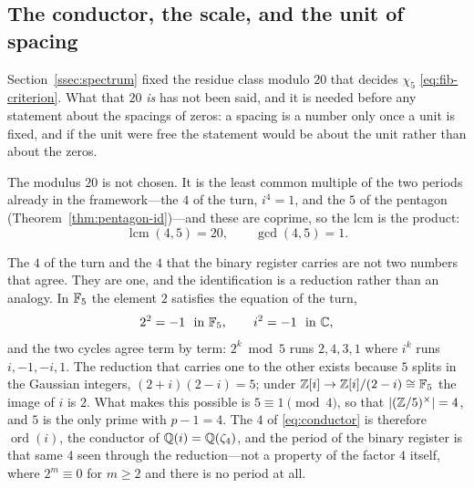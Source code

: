 \subsection{The conductor, the scale, and the unit of spacing}\label{ssec:spacings}

Section~\ref{ssec:spectrum} fixed the residue class modulo $20$ that decides $\chi_5$
\eqref{eq:fib-criterion}. What that $20$ \emph{is} has not been said, and it is needed before any
statement about the spacings of zeros: a spacing is a number only once a unit is fixed, and if the
unit were free the statement would be about the unit rather than about the zeros.

\begin{proposition}\label{prop:conductor}
The modulus $20$ is not chosen. It is the least common multiple of the two periods already in the
framework---the $4$ of the turn, $i^{4}=1$, and the $5$ of the pentagon
(Theorem~\ref{thm:pentagon-id})---and these are coprime, so the lcm is the product:
\begin{equation}\label{eq:conductor}
  \operatorname{lcm}(4,5)=20,\qquad \gcd(4,5)=1 .
\end{equation}
\end{proposition}

\begin{proposition}\label{prop:four-cocone}
The $4$ of the turn and the $4$ that the binary register carries are not two numbers that agree.
They are one, and the identification is a reduction rather than an analogy. In $\mathbb{F}_5$ the element
$2$ satisfies the equation of the turn,
\begin{equation}\label{eq:two-is-i}
  2^{2}=-1 \ \text{ in } \mathbb{F}_5, \qquad i^{2}=-1 \ \text{ in } \mathbb{C} ,
\end{equation}
and the two cycles agree term by term: $2^{k}\bmod 5$ runs $2,4,3,1$ where $i^{k}$ runs
$i,-1,-i,1$. The reduction that carries one to the other exists because $5$ splits in the Gaussian
integers, $(2+i)(2-i)=5$; under $\mathbb{Z}[i]\to\mathbb{Z}[i]/(2-i)\cong\mathbb{F}_5$ the image of $i$ is $2$. What makes
this possible is $5\equiv1\pmod4$, so that $\lvert(\mathbb{Z}/5)^{\times}\rvert=4$, and $5$ is the only
prime with $p-1=4$. The $4$ of \eqref{eq:conductor} is therefore $\operatorname{ord}(i)$, the
conductor of $\mathbb{Q}(i)=\mathbb{Q}(\zeta_4)$, and the period of the binary register is that same $4$ seen
through the reduction---not a property of the factor $4$ itself, where $2^{m}\equiv0$ for
$m\geq2$ and there is no period at all.

\end{proposition}

